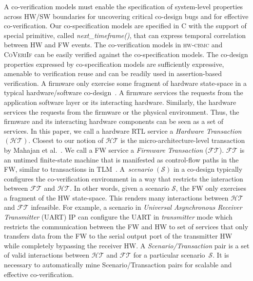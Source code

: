 \documentclass[sigconf]{acmart}
\newcommand{\tool}[1]{\textsc{#1}\xspace}
\newcommand{\hwcbmcv}{\tool{hw-cbmc}}
\newcommand{\verifox}{\tool{CoVeriIf}}
\begin{document}
A co-verification models must enable the specification of system-level 
properties across HW/SW boundaries for uncovering critical co-design bugs 
and for effective co-verification.  Our co-specification models are 
specified in C with the support of special primitive, called {\em next\_timeframe()}, 
that can express temporal correlation between HW and FW events. The
co-verification models in \hwcbmcv and \verifox can be easily verified against 
the co-specification models.  The co-design properties expressed by 
co-specification models are sufficiently expressive, amenable to 
verification reuse and can be readily used in assertion-based verification.  
%
A firmware only exercise some fragment of hardware state-space in a typical 
hardware/software
co-design~\cite{polig2014micro,polig2014fpl,giefers2015accelerating}.  
A firmware services the requests from the application software 
layer or its interacting hardware.  Similarly, the hardware services 
the requests from the firmware or the
physical environment.  Thus, the firmware and its interacting hardware
components can be seen as a set of services.  In this paper, we call a
hardware RTL service a {\em Hardware Transaction} $(\mathcal{HT})$.  Closest
to our notion of $\mathcal{HT}$ is the micro-architecture-level transaction
by Mahajan et al.~\cite{mcbmq}.  We call a FW service a {\em Firmware
Transaction} ($\mathcal{FT}$).  $\mathcal{FT}$ is an untimed finite-state
machine that is manifested as control-flow paths in the FW, similar to
transactions in TLM~\cite{codes14}.  A~{\em scenario} $(\mathcal{S})$ in a
co-design typically configures the co-verification environment in a way that
restricts the interaction between $\mathcal{FT}$ and $\mathcal{HT}$.  In
other words, given a scenario $\mathcal{S}$, the FW only exercises a fragment
of the HW state-space.  This renders many interactions between
$\mathcal{HT}$ and $\mathcal{FT}$ infeasible. For example, a scenario in 
\emph{Universal Asynchronous Receiver Transmitter} (UART) IP can configure the 
UART in \emph{transmitter} mode which restricts the communication between the FW 
and HW to set of services that only transfers data from the FW to the serial output 
port of the transmitter HW while completely bypassing the receiver HW.  
A {\em Scenario/Transaction} pair is a set of valid interactions between 
$\mathcal{HT}$ and $\mathcal{FT}$ for a particular scenario~$\mathcal{S}$.  
It is necessary to automatically mine Scenario/Transaction pairs for scalable 
and effective co-verification.
\end{document}
